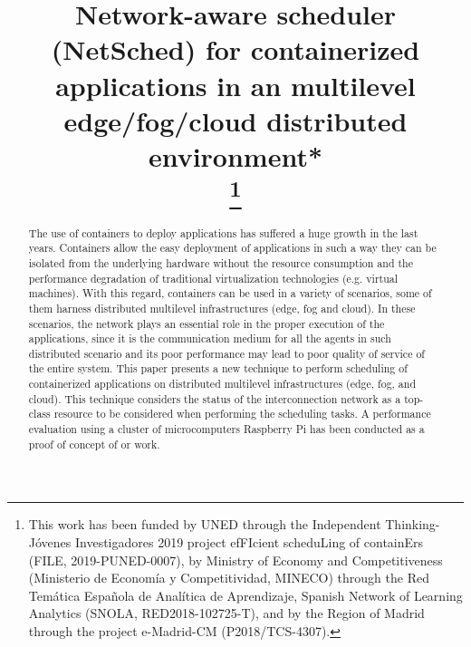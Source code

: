 \documentclass[conference]{IEEEtran}
\begin{document}
\title{Network-aware scheduler (NetSched) for containerized applications in an multilevel edge/fog/cloud distributed environment*\\
\thanks{This work has been funded by UNED through the Independent Thinking-J\'ovenes Investigadores 2019 project efFIcient scheduLing of containErs (FILE, 2019-PUNED-0007), by Ministry of Economy and Competitiveness (Ministerio de Econom\'ia y Competitividad, MINECO) through the Red Tem\'atica Espa\~nola de Anal\'itica de Aprendizaje, Spanish Network of Learning Analytics (SNOLA, RED2018-102725-T), and by the Region of Madrid through the project e-Madrid-CM (P2018/TCS-4307).
}
}

\author{
}


\maketitle

\begin{abstract}


The use of containers to deploy applications has suffered a huge growth in the last years. Containers allow the easy deployment of applications in such a way they can be isolated from the underlying hardware without the resource consumption and the performance degradation of traditional virtualization technologies (e.g. virtual machines). With this regard, containers can be used in a variety of scenarios, some of them harness distributed multilevel infrastructures (edge, fog and cloud). In these scenarios, the network plays an essential role in the proper execution of the applications, since it is the communication medium for all the agents in such distributed scenario and its poor performance may lead to poor quality of service of the entire system. This paper presents a new technique to perform scheduling of containerized applications on distributed multilevel infrastructures  (edge, fog, and cloud). This technique considers the status of the interconnection network as a top-class resource to be considered when performing the scheduling tasks. A performance evaluation using a cluster of microcomputers Raspberry  Pi has been conducted as a proof of concept of or work.



\end{abstract}
\end{document}
